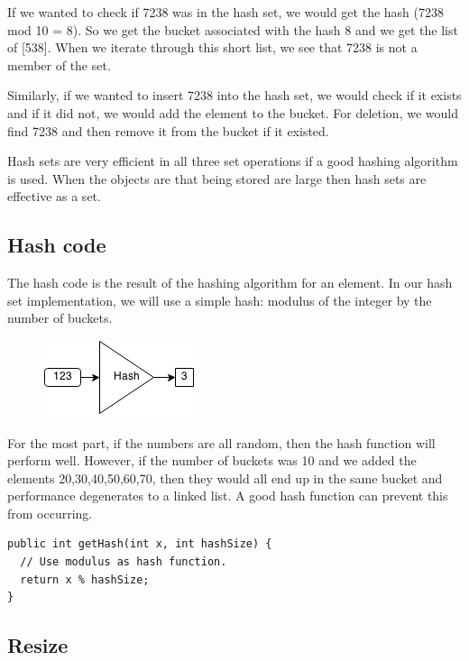 \documentclass[11pt,oneside]{book}
\makeatletter
\def\maxwidth#1{\ifdim\Gin@nat@width>#1 #1\else\Gin@nat@width\fi}
\makeatother
\begin{document}
If we wanted to check if 7238 was in the hash set, we would get the hash (7238 mod 10 = 8). So we get the bucket associated with the hash 8 and we get the list of [538]. When we iterate through this short list, we see that 7238 is not a member of the set.

Similarly, if we wanted to insert 7238 into the hash set, we would check if it exists and if it did not, we would add the element to the bucket. For deletion, we would find 7238 and then remove it from the bucket if it existed.

Hash sets are very efficient in all three set operations if a good hashing algorithm is used. When the objects are that being stored are large then hash sets are effective as a set.

\subsection{Hash code}

The hash code is the result of the hashing algorithm for an element. In our hash set implementation, we will use a simple hash: modulus of the integer by the number of buckets.

\vspace{5px}\begin{figure}[H]\centering
        \includegraphics[width=0.66\maxwidth{\textwidth}]{hashcode.png}
        \end{figure}

For the most part, if the numbers are all random, then the hash function will perform well. However, if the number of buckets was 10 and we added the elements 20,30,40,50,60,70, then they would all end up in the same bucket and performance degenerates to a linked list. A good hash function can prevent this from occurring.

\begin{lstlisting}
public int getHash(int x, int hashSize) {
  // Use modulus as hash function.
  return x % hashSize;
}
\end{lstlisting}

\subsection{Resize}
\end{document}
